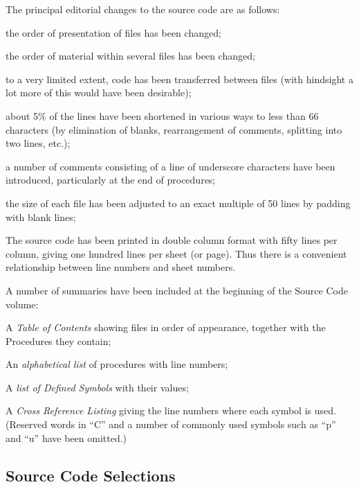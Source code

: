 The principal editorial changes to the
source code are as follows:

\bi
\item the order of presentation of files
has been changed;

\item the order of material within
several files has been changed;

\item to a very limited extent, code has
been transferred between files
(with hindsight a lot more of this
would have been desirable);

\item about 5\% of the lines have been
shortened in various ways to less
than 66 characters (by elimination
of blanks, rearrangement of comments,
splitting into two lines, etc.);

\item a number of comments consisting of
a line of underscore characters
have been introduced, particularly
at the end of procedures;

\item the size of each file has been
adjusted to an exact multiple of
50 lines by padding with blank
lines;
\ei


The source code has been printed in
double column format with fifty lines
per column, giving one hundred lines
per sheet (or page). Thus there is a
convenient relationship between line
numbers and sheet numbers.

A number of summaries have been
included at the beginning of the Source
Code volume:

\bi
\item A {\it Table of Contents} showing files
in order of appearance, together
with the Procedures they contain;

\item An {\it alphabetical list} of procedures
with line numbers;

\item A {\it list of Defined Symbols} with
their values;

\item A {\it Cross Reference Listing} giving
the line numbers where each symbol
is used. (Reserved words in ``C''
and a number of commonly used symbols
such as ``p'' and ``u'' have been
omitted.)
\ei

\subsection{Source Code Selections}

